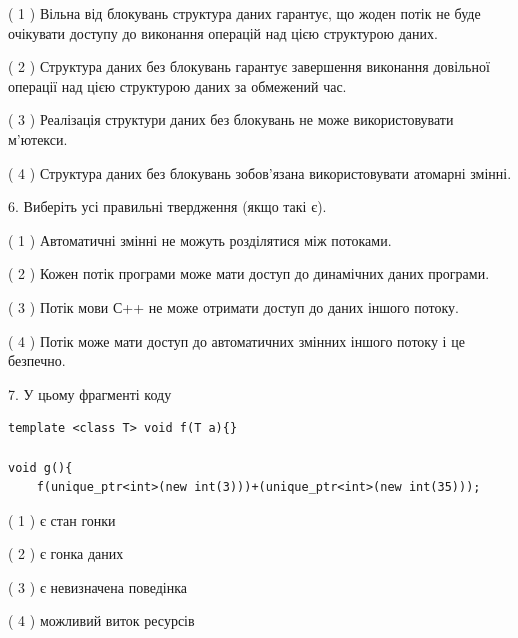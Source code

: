 \documentclass[12pt, ukrainian]{article}
\begin{document}
\begin {large}
{( 1 ) Вільна від блокувань структура даних гарантує, що жоден потік не буде очікувати доступу до виконання операцій над цією структурою даних.%

( 2 ) Структура даних без блокувань гарантує завершення виконання довільної операції над цією структурою даних за обмежений час.%

( 3 ) Реалізація структури даних без блокувань не може використовувати м’ютекси.%

( 4 ) Структура даних без блокувань зобов’язана використовувати атомарні змінні.%
\newpage



\vspace{5mm}
6. Виберіть усі правильні твердження (якщо такі є).\par
\vspace{2mm}

( 1 ) Автоматичні змінні не можуть розділятися між потоками.%

( 2 ) Кожен потік програми може мати доступ до динамічних даних програми.%

( 3 ) Потік мови С++ не може отримати доступ до даних іншого потоку.%

( 4 ) Потік може мати доступ до автоматичних змінних іншого потоку і це безпечно.%


\vspace{5mm}
7. У цьому фрагменті коду
\begin{verbatim}
template <class T> void f(T a){}

void g(){
    f(unique_ptr<int>(new int(3)))+(unique_ptr<int>(new int(35)));
\end{verbatim}

( 1 ) є стан гонки%

( 2 ) є гонка даних%

( 3 ) є невизначена поведінка%

( 4 ) можливий виток ресурсів%
}
\end {large}
\end{document}
